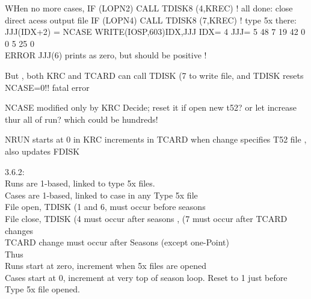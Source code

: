 \documentclass{article}
\begin{document}
WHen no more cases, 
\qi IF (LOPN2) CALL TDISK8 (4,KREC) ! all done: close direct acess output file
\qi IF (LOPN4) CALL TDISK8 (7,KREC) ! type 5x
\qi  there: JJJ(IDX+2) = NCASE
\qii WRITE(IOSP,603)IDX,JJJ
\qii IDX= 4  JJJ=    5   48    7   19   42    0    0    5   25    0
 \\ ERROR JJJ(6) prints as zero, but should be positive !

But , both KRC and TCARD can call TDISK (7 to write file, and TDISK resets NCASE=0!! fatal error

NCASE modified only by KRC
Decide; reset it if open new t52?  or let increase thur all of run?
  which could be hundreds!


NRUN starts at 0 in KRC
increments in TCARD when change specifies T52 file , also updates FDISK


3.6.2:
\\ Runs are 1-based, linked to type 5x files.
\\ Cases are 1-based, linked to case in any Type 5x file
\\ File open,  TDISK (1 and 6, must occur before seasons 
\\ File close, TDISK (4 must occur after seasons , (7 must occur after TCARD changes
\\ TCARD change must occur after Seasons (except one-Point)
\\ Thus
\\  Runs start at zero, increment when 5x files are opened
\\  Cases start at 0, increment at very top of season loop. Reset to 1 just before Type 5x file opened. 
\end{document}
